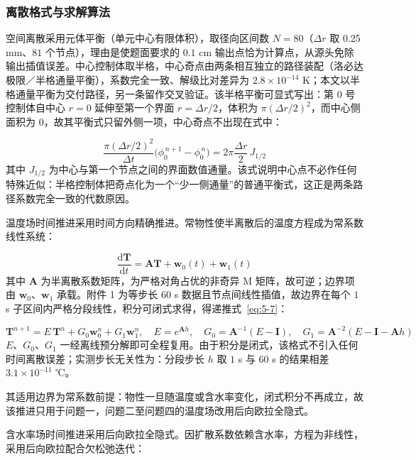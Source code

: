 \subsubsection{离散格式与求解算法}
空间离散采用元体平衡（单元中心有限体积），取径向区间数 $N=80$（$\Delta r$ 取 0.25 mm、$81$ 个节点），理由是使题面要求的 $0.1$ cm 输出点恰为计算点，从源头免除输出插值误差。中心控制体取半格，中心奇点由两条相互独立的路径装配（洛必达极限／半格通量平衡），系数完全一致、解级比对差异为 $2.8\times10^{-14}$ K；本文以半格通量平衡为交付路径，另一条留作交叉验证。该半格平衡可显式写出：第 $0$ 号控制体自中心 $r=0$ 延伸至第一个界面 $r=\Delta r/2$，体积为 $\pi(\Delta r/2)^2$，而中心侧面积为 $0$，故其平衡式只留外侧一项，中心奇点不出现在式中：

\begin{equation}
  \frac{\pi(\Delta r/2)^2}{\Delta t}\big(\phi_0^{\,n+1}-\phi_0^{\,n}\big)=2\pi\frac{\Delta r}{2}\,J_{1/2}
  \label{eq:5-20}
\end{equation}
其中 $J_{1/2}$ 为中心与第一个节点之间的界面数值通量。该式说明中心点不必作任何特殊近似：半格控制体把奇点化为一个“少一侧通量”的普通平衡式，这正是两条路径系数完全一致的代数原因。

温度场时间推进采用时间方向精确推进。常物性使半离散后的温度方程成为常系数线性系统：

\begin{equation}
  \frac{\mathrm d\mathbf T}{\mathrm dt}=\mathbf A\mathbf T+\mathbf w_0(t)+\mathbf w_1(t)
  \label{eq:5-6}
\end{equation}
其中 $\mathbf A$ 为半离散系数矩阵，为严格对角占优的非奇异 M 矩阵，故可逆；边界项由 $\mathbf w_0$、$\mathbf w_1$ 承载。附件 1 为等步长 $60$ s 数据且节点间线性插值，故边界在每个 $1$ s 子区间内严格分段线性，积分可闭式求得，得递推式~\eqref{eq:5-7}：

\begin{equation}
  \mathbf T^{n+1}=E\,\mathbf T^{n}+G_0\mathbf w_0^{n}+G_1\mathbf w_1^{n},\quad E=e^{\mathbf A h},\quad G_0=\mathbf A^{-1}(E-\mathbf I),\quad G_1=\mathbf A^{-2}(E-\mathbf I-\mathbf A h)
  \label{eq:5-7}
\end{equation}
$E$、$G_0$、$G_1$ 一经离线预分解即可全程复用。由于积分是闭式，该格式不引入任何时间离散误差；实测步长无关性为：分段步长 $h$ 取 $1$ s 与 $60$ s 的结果相差 $3.1\times10^{-11}$ ℃。

其适用边界为常系数前提：物性一旦随温度或含水率变化，闭式积分不再成立，故该推进只用于问题一，问题二至问题四的温度场改用后向欧拉全隐式。

含水率场时间推进采用后向欧拉全隐式。因扩散系数依赖含水率，方程为非线性，采用后向欧拉配合欠松弛迭代：

